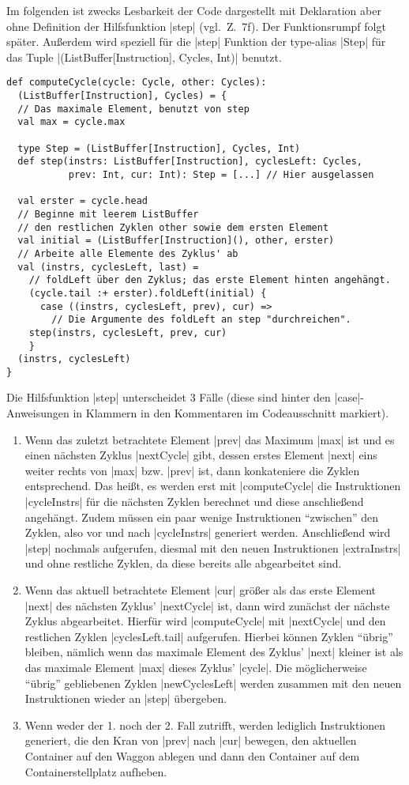 Im folgenden ist zwecks Lesbarkeit der Code dargestellt mit Deklaration aber ohne Definition der Hilfsfunktion |step| (vgl.\ Z.\ 7f).
Der Funktionsrumpf folgt später.
Außerdem wird speziell für die |step| Funktion der type-alias |Step| für das Tuple |(ListBuffer[Instruction], Cycles, Int)| benutzt.
\lstset{basicstyle=\ttfamily}
\begin{lstlisting}
def computeCycle(cycle: Cycle, other: Cycles):
  (ListBuffer[Instruction], Cycles) = {
  // Das maximale Element, benutzt von step
  val max = cycle.max

  type Step = (ListBuffer[Instruction], Cycles, Int)
  def step(instrs: ListBuffer[Instruction], cyclesLeft: Cycles,
           prev: Int, cur: Int): Step = [...] // Hier ausgelassen

  val erster = cycle.head
  // Beginne mit leerem ListBuffer
  // den restlichen Zyklen other sowie dem ersten Element
  val initial = (ListBuffer[Instruction](), other, erster)
  // Arbeite alle Elemente des Zyklus' ab
  val (instrs, cyclesLeft, last) =
    // foldLeft über den Zyklus; das erste Element hinten angehängt.
    (cycle.tail :+ erster).foldLeft(initial) {
      case ((instrs, cyclesLeft, prev), cur) =>
        // Die Argumente des foldLeft an step "durchreichen".
	step(instrs, cyclesLeft, prev, cur)
    }
  (instrs, cyclesLeft)
}
\end{lstlisting}
\lstset{basicstyle=\ttfamily}
Die Hilfsfunktion |step| unterscheidet 3 Fälle (diese sind hinter den |case|-Anweisungen in Klammern in den Kommentaren im Codeausschnitt markiert).
\begin{enumerate}
 \item Wenn das zuletzt betrachtete Element |prev| das Maximum |max| ist und es einen nächsten Zyklus |nextCycle| gibt,
       dessen erstes Element |next| eins weiter rechts von |max| bzw. |prev| ist, dann konkateniere die Zyklen entsprechend.
       Das heißt, es werden erst mit |computeCycle| die Instruktionen |cycleInstrs| für die nächsten Zyklen berechnet
       und diese anschließend angehängt. Zudem müssen ein paar wenige Instruktionen ``zwischen'' den Zyklen,
       also vor und nach |cycleInstrs| generiert werden. Anschließend wird |step| nochmals aufgerufen,
       diesmal mit den neuen Instruktionen |extraInstrs| und ohne restliche Zyklen, da diese bereits alle abgearbeitet sind.
 \item Wenn das aktuell betrachtete Element |cur| größer als das erste Element |next| des nächsten Zyklus' |nextCycle| ist,
       dann wird zunächst der nächste Zyklus abgearbeitet.
       Hierfür wird |computeCycle| mit |nextCycle| und den restlichen Zyklen |cyclesLeft.tail| aufgerufen.
       Hierbei können Zyklen ``übrig'' bleiben,
       nämlich wenn das maximale Element des Zyklus' |next| kleiner ist als das maximale Element |max| dieses Zyklus' |cycle|.
       Die möglicherweise ``übrig'' gebliebenen Zyklen |newCyclesLeft| werden zusammen mit den neuen Instruktionen wieder an |step| übergeben.
 \item Wenn weder der 1. noch der 2. Fall zutrifft, werden lediglich Instruktionen generiert,
       die den Kran von |prev| nach |cur| bewegen, den aktuellen Container auf den Waggon ablegen und dann den Container auf dem Containerstellplatz aufheben.
\end{enumerate}
